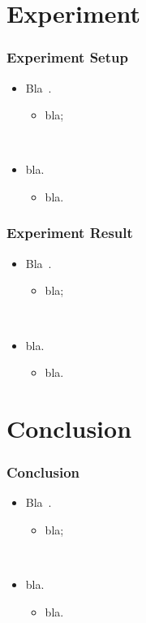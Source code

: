\documentclass{beamer}
\begin{document}
\section{Experiment}
\begin{frame}
  \frametitle{Experiment Setup}

  \begin{itemize}
    \item Bla~\cite{rabiner_fundamentals_1993}.
      \begin{itemize}
        \item bla; 
      \end{itemize}
      ~

    \item bla.
      \begin{itemize}
        \item bla.
      \end{itemize}
  \end{itemize}
\end{frame}

\begin{frame}
  \frametitle{Experiment Result}

  \begin{itemize}
    \item Bla~\cite{rabiner_fundamentals_1993}.
      \begin{itemize}
        \item bla; 
      \end{itemize}
      ~

    \item bla.
      \begin{itemize}
        \item bla.
      \end{itemize}
  \end{itemize}
\end{frame}

\section{Conclusion}
\begin{frame}
  \frametitle{Conclusion}

  \begin{itemize}
    \item Bla~\cite{rabiner_fundamentals_1993}.
      \begin{itemize}
        \item bla; 
      \end{itemize}
      ~

    \item bla.
      \begin{itemize}
        \item bla.
      \end{itemize}
  \end{itemize}
\end{frame}
\end{document}
